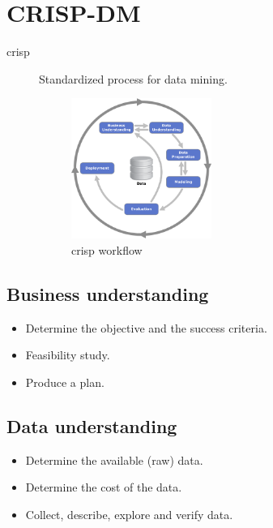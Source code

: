 \chapter{CRISP-DM}

\begin{description}
    \item[\Acl{crisp}] 
        Standardized process for data mining.
        \begin{figure}[ht]
            \centering
            \includegraphics[width=0.45\textwidth]{img/crisp.png}
            \caption{\ac{crisp} workflow}
        \end{figure}
\end{description}


\section{Business understanding}
\begin{itemize}
    \item Determine the objective and the success criteria.
    \item Feasibility study.
    \item Produce a plan.
\end{itemize}

\section{Data understanding}
\begin{itemize}
    \item Determine the available (raw) data.
    \item Determine the cost of the data.
    \item Collect, describe, explore and verify data.
\end{itemize}

